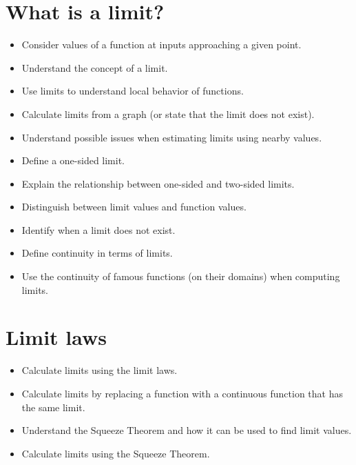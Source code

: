 \documentclass{ximera}
\begin{document}
\section{What is a limit?}
     \begin{itemize}
	\item Consider  values of a function  at inputs approaching a given point.
	\item Understand the concept of a limit.
        \item Use limits to understand local behavior of functions.
	\item Calculate limits from a graph (or state that the limit does not exist).
	\item Understand possible issues when estimating limits using
          nearby values.
	\item Define a one-sided limit.
	\item Explain the relationship between one-sided and two-sided limits.
	\item Distinguish between limit values and function values.
	\item Identify when a limit does not exist.
	\item Define continuity in terms of limits.
	\item Use the continuity of famous functions (on their domains) when computing limits. 
\end{itemize}
\section{Limit laws}
\begin{itemize}
\item Calculate limits using the limit laws.
 \item Calculate limits by replacing a function with a continuous
  function that has the same limit.
\item Understand the Squeeze Theorem and how it can be used to find limit values.
\item Calculate limits using the Squeeze Theorem.\end{itemize}
\end{document}
